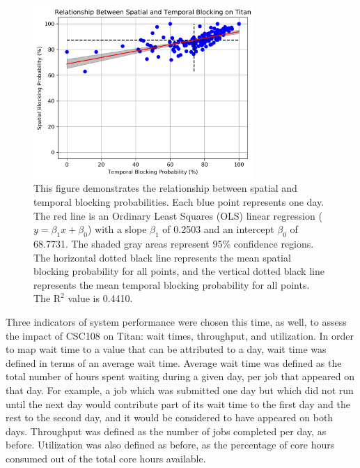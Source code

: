 \begin{figure}
  \includegraphics[width=0.75\textwidth]{images/linfit-spatial-vs-temporal-by-day.png}
\caption{This figure demonstrates the relationship between spatial and temporal
blocking probabilities. Each blue point represents one day. The red line is an
Ordinary Least Squares (OLS) linear regression ($y = \beta_{1}x + \beta_0$)
with a slope $\beta_1$ of 0.2503 and an intercept $\beta_0$ of 68.7731. The
shaded gray areas represent 95\% confidence regions. The horizontal dotted
black line represents the mean spatial blocking probability for all points, and
the vertical dotted black line represents the mean temporal blocking
probability for all points. The $\text{R}^2$ value is 0.4410.}
\label{fig:spatial-vs-temporal}
\end{figure}

Three indicators of system performance were chosen this time, as well, to
assess the impact of CSC108 on Titan: wait times, throughput, and utilization.
In order to map wait time to a value that can be attributed to a day, wait time
was defined in terms of an average wait time. Average wait time was defined as
the total number of hours spent waiting during a given day, per job that
appeared on that day. For example, a job which was submitted one day but which
did not run until the next day would contribute part of its wait time to the
first day and the rest to the second day, and it would be considered to have
appeared on both days. Throughput was defined as the number of jobs completed
per day, as before. Utilization was also defined as before, as the percentage
of core hours consumed out of the total core hours available.

